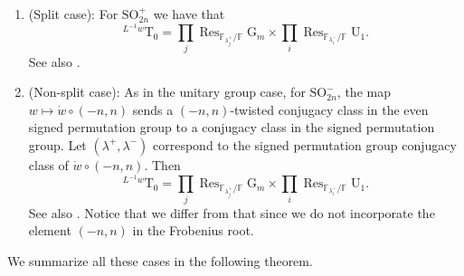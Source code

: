 \documentclass[12pt, reqno]{amsart}
\theoremstyle{definition}
\theoremstyle{definition}
\theoremstyle{definition}
\newcommand{\SO}{\mathrm{SO}}
\newcommand{\UnitaryGroup}{\mathrm{U}}
\newcommand{\finiteField}{\mathbb{F}}
\newcommand{\finiteFieldExtension}[1]{\finiteField_{#1}}
\newcommand{\restrictionOfScalars}[3]{\operatorname{Res}_{#1 \slash #2}{#3}}
\newcommand{\multiplcativeScheme}{\algebraicGroup{G}_m}
\newcommand{\algebraicGroup}[1]{\boldsymbol{\mathrm{#1}}}
\begin{document}
\begin{enumerate}
        \begin{enumerate}
        	\item (Split case): For $\algebraicGroup{\SO}_{2n}^+$ we have that
        	$$^{L^{-1}w}\algebraicGroup{T}_0 = \prod_{j} \restrictionOfScalars{\finiteFieldExtension{\lambda^+_j}}{\finiteField}{\multiplcativeScheme} \times \prod_{i} \restrictionOfScalars{\finiteFieldExtension{\lambda^-_i}}{\finiteField}{\algebraicGroup{\UnitaryGroup}_1}.$$
			See also \cite[Section 3.2 Parts (C) and (D)]{Zalesski2018}.        	
        	\item (Non-split case): As in the unitary group case, for $\algebraicGroup{SO}_{2n}^-$, the map $w \mapsto \dot{w}\circ (-n,n)$ sends a $(-n,n)$-twisted conjugacy class in the even signed permutation group to a conjugacy class in the signed permutation group. Let $(\lambda^+,\lambda^-)$ correspond to the signed permutation group conjugacy class of $\dot{w} \circ (-n,n)$. Then
        	$$^{L^{-1}w}\algebraicGroup{T}_0 = \prod_{j} \restrictionOfScalars{\finiteFieldExtension{\lambda^+_j}}{\finiteField}{\multiplcativeScheme} \times \prod_{i} \restrictionOfScalars{\finiteFieldExtension{\lambda^-_i}}{\finiteField}{\algebraicGroup{\UnitaryGroup}_1}.$$
			See also \cite[Section 3.2 Part (D)]{Zalesski2018}. Notice that we differ from that \cite{Zalesski2018} since we do not incorporate the element $\left(-n, n\right)$ in the Frobenius root.
        \end{enumerate}
    \end{enumerate}
	We summarize all these cases in the following theorem.
	
\end{document}
